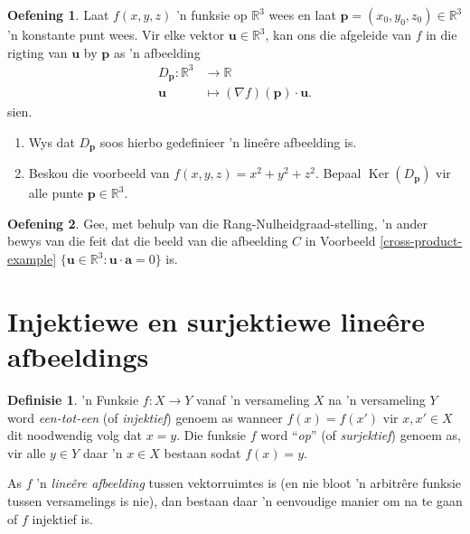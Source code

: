 \documentclass[a4paper,11pt]{book}
\theoremstyle{definition}
\newtheorem{definition}[theorem]{Definisie}
\newtheorem{exercise}{Oefening}
\newcommand{\ve}[1]{\mathbf{#1}}
\DeclareMathOperator{\Ker}{Ker}
\begin{document}
\begin{exercise} Laat $f(x,y,z)$ 'n funksie op $\mathbb{R}^3$ wees en laat
	$\ve{p} = (x_0, y_0, z_0) \in \mathbb{R}^3$ 'n konstante punt wees. Vir
	elke vektor $\ve{u} \in \mathbb{R}^3$,  kan ons die afgeleide van $f$
	in die rigting van $\ve{u}$ by $\ve{p}$ as 'n afbeelding
	\begin{align*}
		D_{\ve{p}} : \mathbb{R}^3 &\rightarrow \mathbb{R} \\
		\ve{u} &\mapsto (\nabla f)(\ve{p}) \cdot \ve{u}.
	\end{align*}
	sien.
	\begin{enumerate} 
		\item Wys dat $D_{\ve{p}}$ soos hierbo gedefinieer 'n line{\^e}re
			afbeelding is. 
		\item Beskou die voorbeeld van $f(x,y,z) = x^2 + y^2 + z^2$. Bepaal
			$\Ker(D_\ve{p})$ vir alle punte $\ve{p} \in \mathbb{R}^3$.
	\end{enumerate}
\end{exercise}


\begin{exercise} Gee, met behulp van die Rang-Nulheidgraad-stelling, 'n
	ander bewys van die feit dat die beeld van die afbeelding $C$ in
	Voorbeeld \ref{cross-product-example} $\{ \ve{u} \in \mathbb{R}^3 :
	\ve{u} \cdot \ve{a} = 0 \}$ is.
\end{exercise}



\section{Injektiewe en surjektiewe line{\^e}re afbeeldings}\label{ACh3Sec6InjectiveSurjective}

\begin{definition} 'n Funksie $f : X \rightarrow Y$ vanaf 'n versameling
	$X$ na 'n versameling $Y$ word \emph{een-tot-een} (of \emph{injektief})
	genoem as wanneer $f(x) = f(x')$ vir $x, x' \in X$ dit noodwendig volg
	dat $x = y$. Die funksie $f$ word ``\emph{op}'' (of \emph{surjektief})
	genoem as, vir alle $y \in Y$ daar 'n $x \in X$ bestaan sodat $f(x) =
	y$.
\end{definition}

As $f$ 'n \emph{line{\^e}re afbeelding} tussen vektorruimtes is (en nie
bloot 'n arbitr{\^e}re funksie tussen versamelings is nie), dan bestaan
daar 'n eenvoudige manier om na te gaan of $f$ injektief is.
\end{document}

